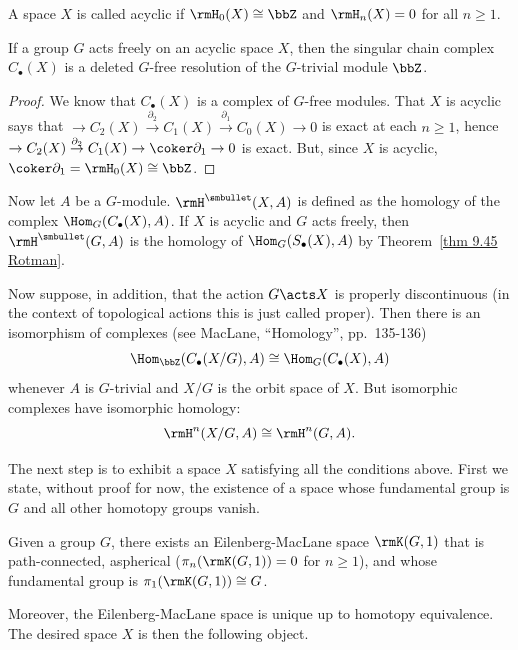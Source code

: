 \begin{defn}
    A space $X$ is called acyclic if $\rmH_0(X)\cong \bbZ$ and $\rmH_n(X)=0$ for all $n\geq 1$.
\end{defn}

\begin{thm}\label{thm 9.45 Rotman}
    If a group $G$ acts freely on an acyclic space $X$, then the singular chain complex $C_\bullet(X)$ is a deleted $G$-free resolution of the $G$-trivial module $\bbZ$.
\end{thm}
\begin{proof}
    We know that $C_\bullet(X)$ is a complex of $G$-free modules. That $X$ is acyclic says that $\to C_2(X)\overset{\partial_2}{\to}C_1(X)\overset{\partial_1}{\to}C_0(X)\to 0$ is exact at each $n\geq 1$, hence $\to C_2(X)\overset{\partial_2}{\to}C_1(X)\to \coker \partial_1\to 0$ is exact. But, since $X$ is acyclic, $\coker \partial_1=\rmH_0(X)\cong \bbZ$.
\end{proof}

Now let $A$ be a $G$-module. $\rmH^{\smbullet }(X,A)$ is defined as the homology of the complex $\Hom_G(C_\bullet(X),A)$. If $X$ is acyclic and $G$ acts freely, then $\rmH^{\smbullet }(G,A)$ is the homology of $\Hom_G(S_\bullet(X),A)$ by Theorem~\ref{thm 9.45 Rotman}. 

Now suppose, in addition, that the action $G\acts X$ is properly discontinuous (in the context of topological actions this is just called proper). Then there is an isomorphism of complexes (see MacLane, ``Homology'', pp.~135-136)
\[\Hom_\bbZ(C_\bullet(X\slash G),A)\cong \Hom_G(C_\bullet(X),A)\]
whenever $A$ is $G$-trivial and $X\slash G$ is the orbit space of $X$. But isomorphic complexes have isomorphic homology:
\[\rmH^n(X\slash G,A)\cong \rmH^n(G,A).\label{eq 2 rotman}\]

The next step is to exhibit a space $X$ satisfying all the conditions above. First we state, without proof for now, the existence of a space whose fundamental group is $G$ and all other homotopy groups vanish.

\begin{defn}
    Given a group $G$, there exists an Eilenberg-MacLane space $\rmK(G,1)$ that is path-connected, aspherical ($\pi_n(\rmK(G,1))=0$ for $n\geq 1$), and whose fundamental group is $\pi_1(\rmK(G,1))\cong G$.
\end{defn}

Moreover, the Eilenberg-MacLane space is unique up to homotopy equivalence. The desired space $X$ is then the following object.

